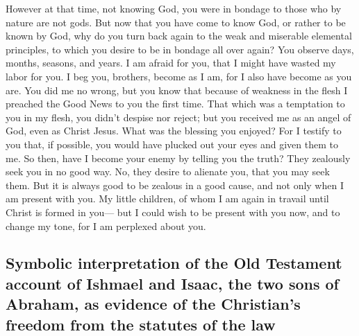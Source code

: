  However at that time, not knowing God, you were in
bondage to those who by nature are not gods.  But now that
you have come to know God, or rather to be known by God, why do you turn
back again to the weak and miserable elemental principles, to which you
desire to be in bondage all over again?  You observe
days, months, seasons, and years.  I am afraid for you,
that I might have wasted my labor for you.  I beg you,
brothers, become as I am, for I also have become as you are. You did me
no wrong,  but you know that because of weakness in the
flesh I preached the Good News to you the first time. 
That which was a temptation to you in my flesh, you didn't despise nor
reject; but you received me as an angel of God, even as Christ Jesus.
 What was the blessing you enjoyed? For I testify to you
that, if possible, you would have plucked out your eyes and given them
to me.  So then, have I become your enemy by telling you
the truth?  They zealously seek you in no good way. No,
they desire to alienate you, that you may seek them.  But
it is always good to be zealous in a good cause, and not only when I am
present with you.  My little children, of whom I am again
in travail until Christ is formed in you---  but I could
wish to be present with you now, and to change my tone, for I am
perplexed about you.

\hypertarget{symbolic-interpretation-of-the-old-testament-account-of-ishmael-and-isaac-the-two-sons-of-abraham-as-evidence-of-the-christians-freedom-from-the-statutes-of-the-law}{%
\subsection{Symbolic interpretation of the Old Testament account of
Ishmael and Isaac, the two sons of Abraham, as evidence of the
Christian's freedom from the statutes of the
law}\label{symbolic-interpretation-of-the-old-testament-account-of-ishmael-and-isaac-the-two-sons-of-abraham-as-evidence-of-the-christians-freedom-from-the-statutes-of-the-law}}


